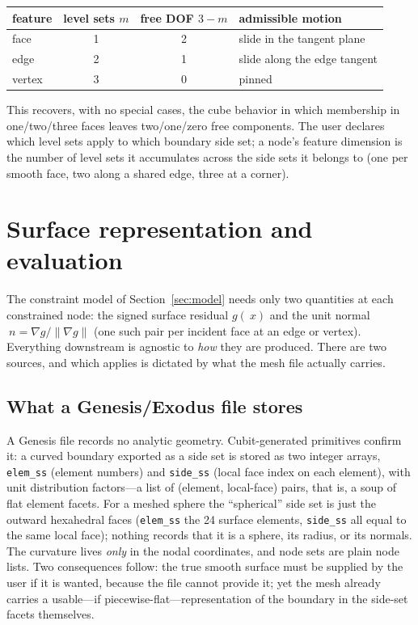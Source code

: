 \documentclass[11pt]{article}
\newcommand{\grad}{\nabla}
\newcommand{\norm}[1]{\lVert #1 \rVert}
\newcommand{\code}[1]{\texttt{#1}}
\begin{document}
\begin{center}
\begin{tabular}{lccl}
\toprule
feature & level sets $m$ & free DOF $3-m$ & admissible motion \\
\midrule
face   & 1 & 2 & slide in the tangent plane \\
edge   & 2 & 1 & slide along the edge tangent \\
vertex & 3 & 0 & pinned \\
\bottomrule
\end{tabular}
\end{center}

This recovers, with no special cases, the cube behavior in which membership in
one/two/three faces leaves two/one/zero free components. The user declares
which level sets apply to which boundary side set; a node's feature dimension is
the number of level sets it accumulates across the side sets it belongs to
(one per smooth face, two along a shared edge, three at a corner).

\section{Surface representation and evaluation}
\label{sec:input}

The constraint model of Section~\ref{sec:model} needs only two quantities at
each constrained node: the signed surface residual $g(~x)$ and the unit normal
$~n=\grad g/\norm{\grad g}$ (one such pair per incident face at an edge or
vertex). Everything downstream is agnostic to \emph{how} they are produced.
There are two sources, and which applies is dictated by what the mesh file
actually carries.

\subsection{What a Genesis/Exodus file stores}
\label{sec:genesis}

A Genesis file records no analytic geometry. Cubit-generated primitives confirm
it: a curved boundary exported as a side set is stored as two integer arrays,
\code{elem\_ss} (element numbers) and \code{side\_ss} (local face index on each
element), with unit distribution factors---a list of (element, local-face)
pairs, that is, a soup of flat element facets. For a meshed sphere the
``spherical'' side set is just the outward hexahedral faces (\code{elem\_ss} the
24 surface elements, \code{side\_ss} all equal to the same local face); nothing
records that it is a sphere, its radius, or its normals. The curvature lives
\emph{only} in the nodal coordinates, and node sets are plain node lists. Two
consequences follow: the true smooth surface must be supplied by the user if it
is wanted, because the file cannot provide it; yet the mesh already carries a
usable---if piecewise-flat---representation of the boundary in the side-set
facets themselves.
\end{document}
